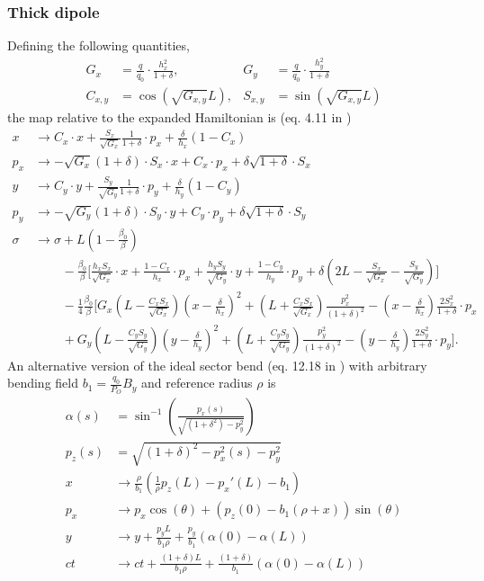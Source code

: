\documentclass[english]{article}
\begin{document}
\subsubsection{Thick dipole}
Defining the following quantities,
\begin{align}
  G_x&= \frac{q}{q_0} \cdot\frac{h_x^2}{1+\delta}, & G_y&= \frac{q}{q_0} \cdot\frac{h_y^2}{1+\delta} \\
  C_{x,y}&=\cos(\sqrt{G_{x,y}}L), & S_{x,y}&=\sin(\sqrt{G_{x,y}}L)
\end{align}
the map relative to the expanded Hamiltonian is (eq. 4.11 in \cite{barber87})
\begin{align*}
  x   &\to C_x \cdot x + \frac{S_x}{\sqrt{G_x}}\frac{1}{1+\delta} \cdot p_x + \frac{\delta}{h_x} (1 - C_x) \\
  p_x &\to -\sqrt{G_x} (1+\delta) \cdot S_x \cdot x + C_x \cdot p_x + \delta \sqrt{1+\delta} \cdot S_x \\
  y   &\to C_y \cdot y + \frac{S_y}{\sqrt{G_y}}\frac{1}{1+\delta} \cdot p_y + \frac{\delta}{h_y} (1 - C_y) \\
  p_y &\to -\sqrt{G_y} (1+\delta) \cdot S_y \cdot y + C_y \cdot p_y + \delta \sqrt{1+\delta} \cdot S_y \\
  \sigma &\to \sigma + L\left(1 - \frac{\beta_0}{\beta}\right) \\
  & \qquad\, -\frac{\beta_0}{\beta} \Bigg[ \frac{h_x S_x}{\sqrt{G_x}} \cdot x + \frac{1-C_x}{h_x} \cdot p_x
  + \frac{h_y S_y}{\sqrt{G_y}} \cdot y + \frac{1-C_y}{h_y} \cdot p_y
  + \delta \left(2L - \frac{S_x}{\sqrt{G_x}} - \frac{S_y}{\sqrt{G_y}} \right) \Bigg] \\
  & \qquad\, - \frac{1}{4}\frac{\beta_0}{\beta} \Bigg[ G_x \left(L-\frac{C_xS_x}{\sqrt{G_x}} \right)
  \left(x - \frac{\delta}{h_x}\right)^2
  + \left(L+\frac{C_xS_x}{\sqrt{G_x}} \right) \frac{p_x^2}{(1+\delta)^2}
  -\left(x-\frac{\delta}{h_x}\right) \frac{2S_x^2}{1+\delta} \cdot p_x \\
  & \qquad\, + G_y \left(L-\frac{C_yS_y}{\sqrt{G_y}} \right)
  \left(y - \frac{\delta}{h_y}\right)^2 + \left(L+\frac{C_yS_y}{\sqrt{G_y}}\right) 
  \frac{p_y^2}{(1+\delta)^2}
  -\left(y-\frac{\delta}{h_y}\right)\frac{2S_y^2}{1+\delta} \cdot p_y \Bigg].
\end{align*}
An alternative version of the ideal sector bend (eq. 12.18 in \cite{forest99}) with arbitrary bending field $b_1=\frac{q_0}{P_O} B_y$ and reference radius $\rho$ is
\begin{align}
  \alpha(s)&=\sin^{-1}\left(
  \frac{p_x(s)}{\sqrt{(1+\delta^2)-p_y^2}}\right)\\
  p_z(s) &= \sqrt{(1+\delta)^2-p_x^2(s) - p_y^2} \\
  x &\to \frac{\rho}{b_1}\left(\frac1\rho p_z(L)- p_x'(L) - b_1\right)\\
  p_x &\to p_x \cos(\theta) + \left(p_z(0)-b_1(\rho+x)\right)\sin(\theta)\\
  y &\to y+\frac{p_y L}{b_1 \rho}+
   \frac{p_y}{b_1}\left(\alpha(0)-\alpha(L)\right)\\
  ct &\to ct + \frac{(1+\delta)L}{b_1\rho}+
          \frac{(1+\delta)}{b_1}\left(\alpha(0)-\alpha(L) \right)
\end{align}
\end{document}
